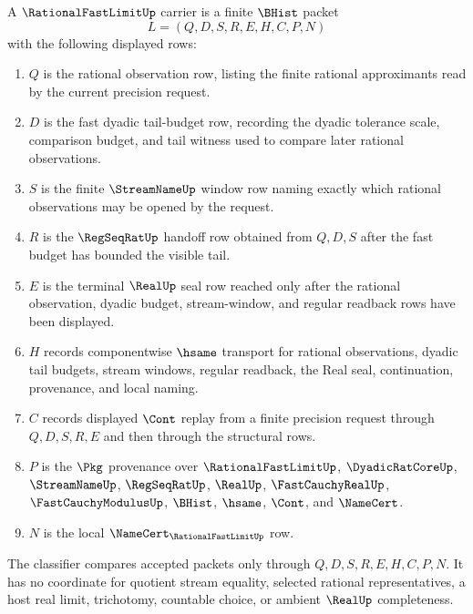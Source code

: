 \begin{definition}\label{def:rational-fast-limit-carrier}
A $\RationalFastLimitUp$ carrier is a finite $\BHist$ packet
$$
L=(Q,D,S,R,E,H,C,P,N)
$$
with the following displayed rows:
\begin{enumerate}
\item $Q$ is the rational observation row, listing the finite rational approximants read by the current precision request.
\item $D$ is the fast dyadic tail-budget row, recording the dyadic tolerance scale, comparison budget, and tail witness used to compare later rational observations.
\item $S$ is the finite $\StreamNameUp$ window row naming exactly which rational observations may be opened by the request.
\item $R$ is the $\RegSeqRatUp$ handoff row obtained from $Q,D,S$ after the fast budget has bounded the visible tail.
\item $E$ is the terminal $\RealUp$ seal row reached only after the rational observation, dyadic budget, stream-window, and regular readback rows have been displayed.
\item $H$ records componentwise $\hsame$ transport for rational observations, dyadic tail budgets, stream windows, regular readback, the Real seal, continuation, provenance, and local naming.
\item $C$ records displayed $\Cont$ replay from a finite precision request through $Q,D,S,R,E$ and then through the structural rows.
\item $P$ is the $\Pkg$ provenance over $\RationalFastLimitUp$, $\DyadicRatCoreUp$, $\StreamNameUp$, $\RegSeqRatUp$, $\RealUp$, $\FastCauchyRealUp$, $\FastCauchyModulusUp$, $\BHist$, $\hsame$, $\Cont$, and $\NameCert$.
\item $N$ is the local $\NameCert_{\RationalFastLimitUp}$ row.
\end{enumerate}
The classifier compares accepted packets only through $Q,D,S,R,E,H,C,P,N$. It has no coordinate for quotient stream equality, selected rational representatives, a host real limit, trichotomy, countable choice, or ambient $\RealUp$ completeness.
\end{definition}

